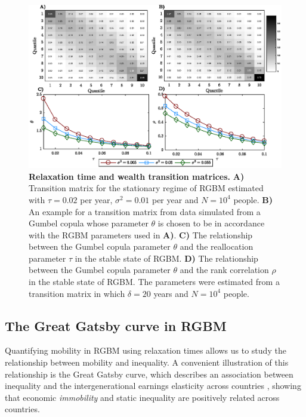 \documentclass[11pt]{article}
\numberwithin{equation}{section}
\begin{document}
\begin{figure}[!htb]
\centering
\includegraphics[width=1.0\textwidth]{figs/fig_rgbm_gumbel_v2.eps}
\caption{\textbf{Relaxation time and wealth transition matrices.} \textbf{A)} Transition matrix for the stationary regime of RGBM estimated with $\tau = 0.02$ per year, $\sigma^2 = 0.01$ per year and $N = 10^4$ people. \textbf{B)} An example for a transition matrix from data simulated from a Gumbel copula whose parameter $\theta$ is chosen to be in accordance with the RGBM parameters used in \textbf{A)}. \textbf{C)} The relationship between the Gumbel copula parameter $\theta$ and the reallocation parameter $\tau$ in the stable state of RGBM. \textbf{D)} The relationship between the Gumbel copula parameter $\theta$ and the rank correlation $\rho$ in the stable state of RGBM. The parameters were estimated from a transition matrix in which $\delta = 20$ years and $N = 10^4$ people.
\label{fig:rgbm-wealth-matrices}}
\end{figure}
\FloatBarrier

\subsection{The Great Gatsby curve in RGBM}

Quantifying mobility in RGBM using relaxation times allows us to study the relationship between mobility and inequality. A convenient illustration of this relationship is the Great Gatsby curve, which describes an association between inequality and the intergenerational earnings elasticity across countries \citep{krueger2012,corak2013}, showing that economic \textit{immobility} and static inequality are positively related across countries.
\end{document}
